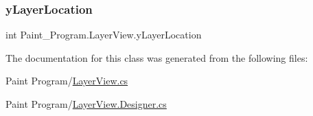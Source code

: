 \mbox{\label{class_paint___program_1_1_layer_view_a4572b531bb2946727fc9a526f75b562d}} 
\subsubsection{\texorpdfstring{y\+Layer\+Location}{yLayerLocation}}
{\footnotesize\ttfamily int Paint\+\_\+\+Program.\+Layer\+View.\+y\+Layer\+Location\hspace{0.3cm}{\ttfamily [private]}}



The documentation for this class was generated from the following files\+:\begin{DoxyCompactItemize}
\item 
Paint Program/\mbox{\hyperlink{_layer_view_8cs}{Layer\+View.\+cs}}\item 
Paint Program/\mbox{\hyperlink{_layer_view_8_designer_8cs}{Layer\+View.\+Designer.\+cs}}\end{DoxyCompactItemize}
